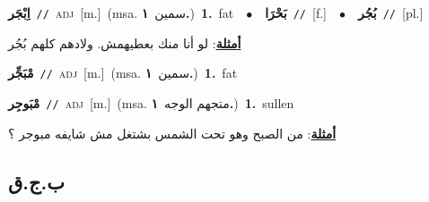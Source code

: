 \documentclass[10pt,a4paper,twoside]{article} %
\begin{document}
\begin{multicols}{2}
{\setlength\topsep{0pt}\textbf{\foreignlanguage{arabic}{اِبْجَر}}\ {\color{gray}\texttt{//}\color{black}}\ \textsc{adj}\ [m.]\ \color{gray}(msa. \foreignlanguage{arabic}{سمين}~\foreignlanguage{arabic}{\textbf{١.}})\color{black}\ \textbf{1.}~fat\ \ $\bullet$\ \ \setlength\topsep{0pt}\textbf{\foreignlanguage{arabic}{بَحْرَا}}\ {\color{gray}\texttt{//}\color{black}}\ [f.]\ \ $\bullet$\ \ \setlength\topsep{0pt}\textbf{\foreignlanguage{arabic}{بُجُر}}\ {\color{gray}\texttt{//}\color{black}}\ [pl.]\  \begin{flushright}\color{gray}\foreignlanguage{arabic}{\textbf{\underline{\foreignlanguage{arabic}{أمثلة}}}: لو أنا منك بعطيهمش. ولادهم كلهم بُجُر}\end{flushright}\color{black}} \vspace{2mm}

{\setlength\topsep{0pt}\textbf{\foreignlanguage{arabic}{مْبَجِّر}}\ {\color{gray}\texttt{//}\color{black}}\ \textsc{adj}\ [m.]\ \color{gray}(msa. \foreignlanguage{arabic}{سمين}~\foreignlanguage{arabic}{\textbf{١.}})\color{black}\ \textbf{1.}~fat\ } \vspace{2mm}

{\setlength\topsep{0pt}\textbf{\foreignlanguage{arabic}{مْبَوجِر}}\ {\color{gray}\texttt{//}\color{black}}\ \textsc{adj}\ [m.]\ \color{gray}(msa. \foreignlanguage{arabic}{متجهم الوجه}~\foreignlanguage{arabic}{\textbf{١.}})\color{black}\ \textbf{1.}~sullen\  \begin{flushright}\color{gray}\foreignlanguage{arabic}{\textbf{\underline{\foreignlanguage{arabic}{أمثلة}}}: من الصبح وهو تحت الشمس بشتغل مش شايفه مبوجر ؟}\end{flushright}\color{black}} \vspace{2mm}

\vspace{-3mm}
\subsection*{\color{blue}\foreignlanguage{arabic}{ب.ج.ق}\color{blue}{}} 


\end{multicols}
\end{document}
